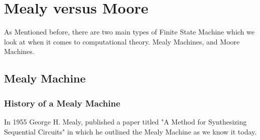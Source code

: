 \documentclass{article}
\begin{document}
\section {Mealy versus Moore}
As Mentioned before, there are two main types of Finite State Machine which we look at when it comes to computational theory. Mealy Machines, and Moore Machines.
\subsection{Mealy Machine}
\subsubsection{History of a Mealy Machine}
In 1955 George H. Mealy, published a paper titled "A Method for Synthesizing Sequential Circuits" in which he outlined the Mealy Machine as we know it today.
\end{document}
